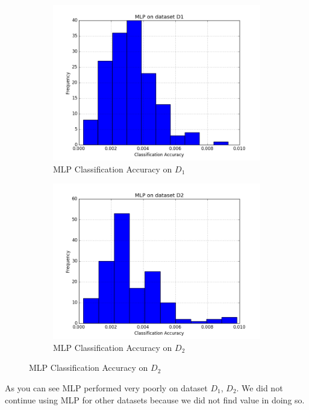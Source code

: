 \begin{figure}[H]
	\centering
	\begin{subfigure}[b]{0.45\linewidth}
		\includegraphics[width=\linewidth]{sections/imgs/mlp/mlp_d1.png}
		\caption{MLP Classification Accuracy on $D_{1}$}
		\label{fig:mlp_d1}
	\end{subfigure}
	\begin{subfigure}[b]{0.45\linewidth}
		\includegraphics[width=\linewidth]{sections/imgs/mlp/mlp_d2.png}
		\caption{MLP Classification Accuracy on $D_{2}$}
		\label{fig:mlp_d1}
	\end{subfigure}
\end{figure}

As you can see MLP performed very poorly on dataset $D_{1}$, $D_{2}$. We did not continue using MLP for other datasets because we did not find value in doing so.


